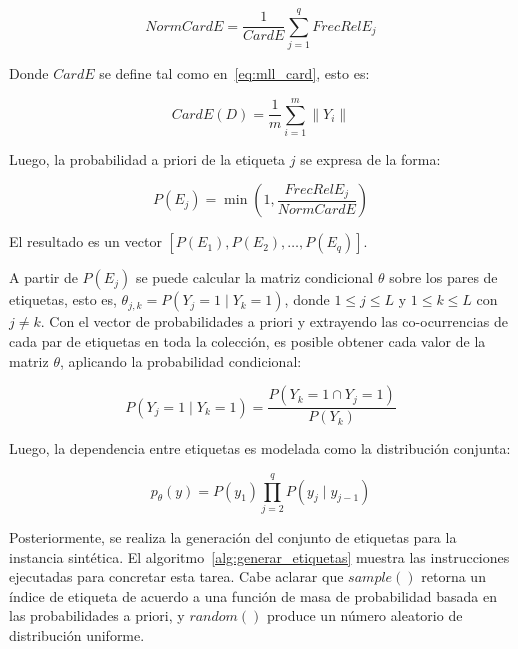 \begin{equation}
	NormCardE = \frac{1}{CardE} \sum_{j=1}^{q} FrecRelE_{j}
\end{equation}

Donde $CardE$ se define tal como en~\ref{eq:mll_card}, esto es:

\begin{equation}
	CardE(D) = \frac{1}{m} \sum_{i=1}^{m} \left\|Y_{i}\right\|
\end{equation}

Luego, la probabilidad a priori de la etiqueta $j$ se expresa de la forma:

\begin{equation}
	P(E_{j}) =\min{(1, \frac{FrecRelE_{j}}{NormCardE})}
\end{equation}

El resultado es un vector $[P(E_{1}), P(E_{2}),\dots, P(E_{q})]$.

A partir de $P(E_{j})$ se puede calcular la matriz condicional $\theta$ sobre
los pares de etiquetas, esto es, $\theta_{j,k} = P(Y_{j} = 1 \mid Y_{k} = 1)$,
donde  $1 \leq j \leq L$ y $1 \leq k \leq L$ con $j \neq k$. Con el vector de
probabilidades a priori y extrayendo las co-ocurrencias de cada par de etiquetas
en toda la colección, es posible obtener cada valor de la matriz $\theta$,
aplicando la probabilidad condicional:

\begin{equation}
	P(Y_{j} = 1 \mid Y_{k} = 1) = \frac{P(Y_{k} = 1 \cap Y_{j} = 1)}{P(Y_{k})}
\end{equation}

Luego, la dependencia entre etiquetas es modelada como la distribución conjunta:

\begin{equation}
	\label{eq:syn_joint}
	p_{\theta}(y) = P(y_{1}) \prod_{j=2}^q P(y_{j} \mid y_{j-1})
\end{equation}

Posteriormente, se realiza la generación del conjunto de etiquetas para la
instancia sintética. El algoritmo~\ref{alg:generar_etiquetas} muestra las
instrucciones ejecutadas para concretar esta tarea. Cabe aclarar que $sample()$
retorna un índice de etiqueta de acuerdo a una función de masa de probabilidad
basada en las probabilidades a priori, y $random()$ produce un número aleatorio
de distribución uniforme.

